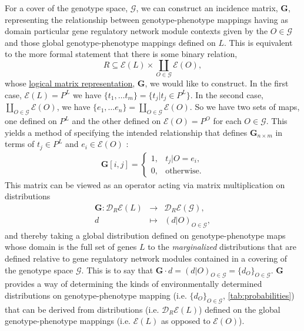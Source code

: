 For a cover of the genotype space, $\mathcal{G}$, we can construct an incidence matrix, $\mathbf{G}$, representing the relationship between genotype-phenotype mappings having as domain particular gene regulatory network module contexts given by the $O \in \mathcal{G}$ and those global genotype-phenotype mappings defined on $L$. This is equivalent to the more formal statement that there is some binary relation,
\begin{equation}
R \subseteq \mathcal{E}(L) \times \coprod_{O \in \mathcal{G}} \mathcal{E}(O),
\end{equation}
whose \href{http://en.wikipedia.org/wiki/Logical_matrix#Matrix_representation_of_a_relation}{logical matrix representation}, $\mathbf{G}$, we would like to construct. In the first case, $\mathcal{E}(L) = P^L$ we have $\{t_1, \ldots t_m\} = \{t_j | t_j \in P^L\}$. In the second case, $\coprod_{O \in \mathcal{G}} \mathcal{E}(O)$, we have $\{e_1, \ldots e_n\} = \coprod_{O \in \mathcal{G}} \mathcal{E}(O)$. So we have two sets of maps, one defined on $P^L$ and the other defined on $\mathcal{E}(O) = P^O$ for each $O \in \mathcal{G}$. This yields a method of specifying the intended relationship that defines $\mathbf{G}_{n \times m}$ in terms of $t_j \in P^L$ and $e_i \in \mathcal{E}(O)$ :
\begin{eqnarray}
\mathbf{G}[i,j] =
\begin{cases}
1, & t_j|O = e_i,\\
0, & \text{otherwise}.
\end{cases}
\end{eqnarray}
This matrix can be viewed as an operator acting via matrix multiplication on distributions
\begin{eqnarray*}
\mathbf{G} \colon \mathcal{D}_R\mathcal{E}(L) &\rightarrow& \mathcal{D}_R\mathcal{E}(\mathcal{G}),\\
d &\mapsto& (d|O)_{O \in \mathcal{G}},
\end{eqnarray*}
and thereby taking a global distribution defined on genotype-phenotype maps whose domain is the full set of genes $L$ to the \emph{marginalized} distributions that are defined relative to gene regulatory network modules contained in a covering of the genotype space $\mathcal{G}$. This is to say that $\mathbf{G} \cdot d = (d|O)_{O \in \mathcal{G}} = \{d_O\}_{O \in \mathcal{G}}$. $\mathbf{G}$ provides a way of determining the kinds of environmentally determined distributions on genotype-phenotype mapping (i.e. $\{d_O\}_{O \in \mathcal{G}}$, \ref{tab:probabilities}) that can be derived from distributions (i.e. $\mathcal{D}_R \mathcal{E}(L)$) defined on the global genotype-phenotype mappings (i.e. $\mathcal{E}(L)$ as opposed to $\mathcal{E}(O)$).

